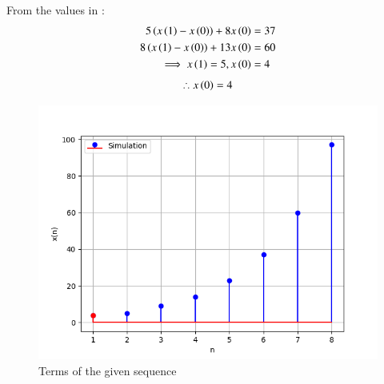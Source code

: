 \documentclass[journal,12pt]{IEEEtran}
\begin{document}
	From the values in :
	\begin{align}
		5 \left(x\left(1\right)-x\left(0\right)\right) + 8 x\left(0\right) &=37\\
		8 \left(x\left(1\right)-x\left(0\right)\right) + 13 x\left(0\right) &=60\\
		\implies x\left(1\right) =5, x\left(0\right) &=4
	\end{align}
	\begin{align}
		\therefore {x\ensuremath{\left(0\right)}=4}
	\end{align}
	\begin{figure}[ht]
		\includegraphics[width = \columnwidth]{figs/fig4}
		\caption{Terms of the given sequence}
		\centering
		\label{fig: fig4}
	\end{figure}
\end{document}
